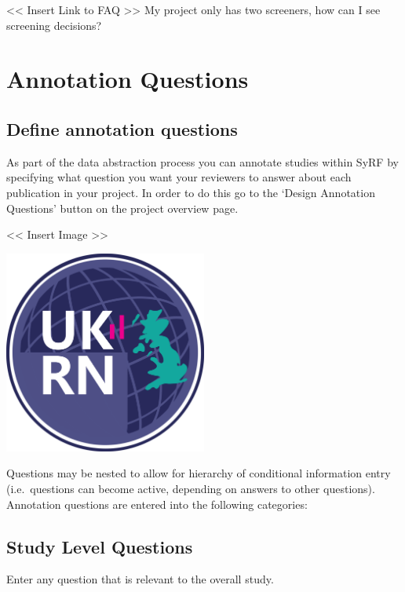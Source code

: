 \documentclass[
]{book}
\begin{document}
\textless{}\textless{} Insert Link to FAQ \textgreater{}\textgreater{}
My project only has two screeners, how can I see screening decisions?

\hypertarget{annotation}{%
\chapter{Annotation Questions}\label{annotation}}

\hypertarget{define-annotation-questions}{%
\section{Define annotation questions}\label{define-annotation-questions}}

As part of the data abstraction process you can annotate studies within SyRF by specifying what question you want your reviewers to answer about each publication in your project.
In order to do this go to the `Design Annotation Questions' button on the project overview page.

\textless{}\textless{} Insert Image \textgreater{}\textgreater{}

\includegraphics[width=0.5\textwidth,height=0.5\textheight]{figs/evidence-triangle.png}

Questions may be nested to allow for hierarchy of conditional information entry (i.e.~questions can become active, depending on answers to other questions).
Annotation questions are entered into the following categories:

\hypertarget{study-level-questions}{%
\section{Study Level Questions}\label{study-level-questions}}

Enter any question that is relevant to the overall study.
\end{document}
